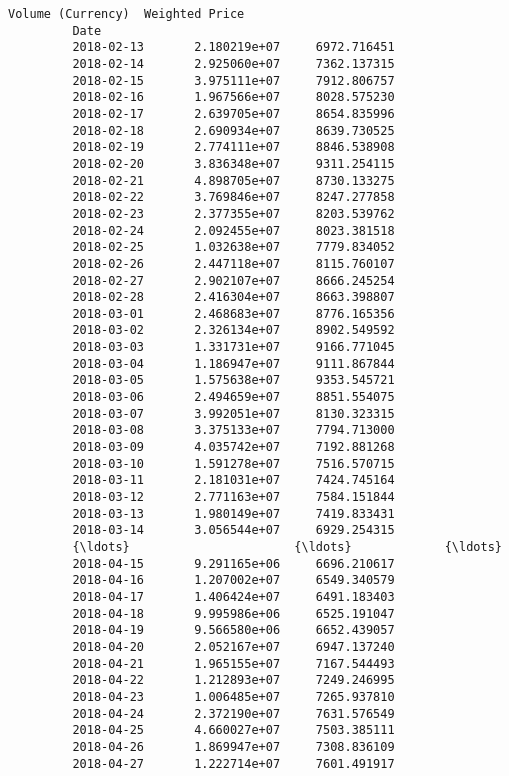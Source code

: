 \documentclass[11pt]{article}
\begin{document}
\begin{Verbatim}[commandchars=\\\{\}]
                     Volume (Currency)  Weighted Price  
         Date                                           
         2018-02-13       2.180219e+07     6972.716451  
         2018-02-14       2.925060e+07     7362.137315  
         2018-02-15       3.975111e+07     7912.806757  
         2018-02-16       1.967566e+07     8028.575230  
         2018-02-17       2.639705e+07     8654.835996  
         2018-02-18       2.690934e+07     8639.730525  
         2018-02-19       2.774111e+07     8846.538908  
         2018-02-20       3.836348e+07     9311.254115  
         2018-02-21       4.898705e+07     8730.133275  
         2018-02-22       3.769846e+07     8247.277858  
         2018-02-23       2.377355e+07     8203.539762  
         2018-02-24       2.092455e+07     8023.381518  
         2018-02-25       1.032638e+07     7779.834052  
         2018-02-26       2.447118e+07     8115.760107  
         2018-02-27       2.902107e+07     8666.245254  
         2018-02-28       2.416304e+07     8663.398807  
         2018-03-01       2.468683e+07     8776.165356  
         2018-03-02       2.326134e+07     8902.549592  
         2018-03-03       1.331731e+07     9166.771045  
         2018-03-04       1.186947e+07     9111.867844  
         2018-03-05       1.575638e+07     9353.545721  
         2018-03-06       2.494659e+07     8851.554075  
         2018-03-07       3.992051e+07     8130.323315  
         2018-03-08       3.375133e+07     7794.713000  
         2018-03-09       4.035742e+07     7192.881268  
         2018-03-10       1.591278e+07     7516.570715  
         2018-03-11       2.181031e+07     7424.745164  
         2018-03-12       2.771163e+07     7584.151844  
         2018-03-13       1.980149e+07     7419.833431  
         2018-03-14       3.056544e+07     6929.254315  
         {\ldots}                       {\ldots}             {\ldots}  
         2018-04-15       9.291165e+06     6696.210617  
         2018-04-16       1.207002e+07     6549.340579  
         2018-04-17       1.406424e+07     6491.183403  
         2018-04-18       9.995986e+06     6525.191047  
         2018-04-19       9.566580e+06     6652.439057  
         2018-04-20       2.052167e+07     6947.137240  
         2018-04-21       1.965155e+07     7167.544493  
         2018-04-22       1.212893e+07     7249.246995  
         2018-04-23       1.006485e+07     7265.937810  
         2018-04-24       2.372190e+07     7631.576549  
         2018-04-25       4.660027e+07     7503.385111  
         2018-04-26       1.869947e+07     7308.836109  
         2018-04-27       1.222714e+07     7601.491917  

\end{Verbatim}
\end{document}
